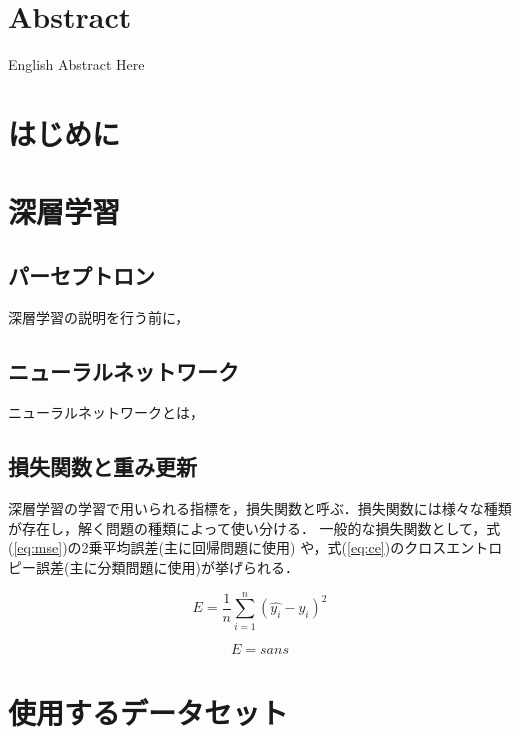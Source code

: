 \documentclass[a4j, 11pt]{jreport}
\begin{document}
\chapter*{Abstract}
English Abstract Here


\newpage
\tableofcontents       %
\thispagestyle{empty}  %
\pagebreak
{} %


\chapter{はじめに}

\newpage
\chapter{深層学習}
\section{パーセプトロン}
深層学習の説明を行う前に，

\section{ニューラルネットワーク}
ニューラルネットワークとは，

\newpage
\section{損失関数と重み更新}
深層学習の学習で用いられる指標を，損失関数と呼ぶ．損失関数には様々な種類が存在し，解く問題の種類によって使い分ける．
一般的な損失関数として，式(\ref{eq:mse})の2乗平均誤差(主に回帰問題に使用) や，式(\ref{eq:ce})のクロスエントロピー誤差(主に分類問題に使用)が挙げられる．

\begin{equation}
	E = \frac{1}{n} \sum_{i=1}^{n} (\hat{y_i} - y_i)^2
	\label{eq:mse}
\end{equation}

\begin{equation}
	E = sans
	\label{eq:ce}
\end{equation}


\newpage
\chapter{使用するデータセット}
\end{document}
